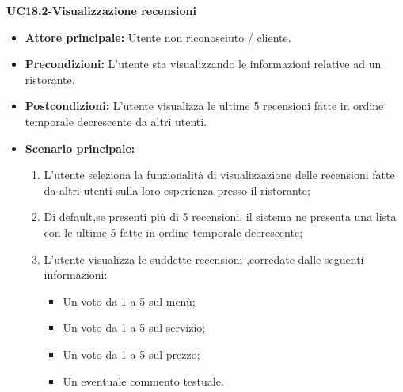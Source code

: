 \textbf{UC18.2-Visualizzazione recensioni}
\begin{itemize}
\item \textbf{Attore principale:} Utente non riconosciuto / cliente.
\item \textbf{Precondizioni:} L'utente sta visualizzando le informazioni relative ad un ristorante.
\item \textbf{Postcondizioni:} L'utente visualizza le ultime 5 recensioni fatte in ordine temporale decrescente da altri utenti.
\item \textbf{Scenario principale:}
\begin{enumerate}
    \item L'utente seleziona la funzionalità di visualizzazione delle recensioni fatte da altri utenti
    sulla loro esperienza presso il ristorante;
    \item Di default,se presenti più di 5 recensioni, il sistema ne presenta una lista con le ultime 5 fatte in ordine temporale decrescente;
    \item L'utente visualizza le suddette recensioni ,corredate dalle seguenti informazioni:
    \begin{itemize}
        \item Un voto da 1 a 5 sul menù;
        \item Un voto da 1 a 5 sul servizio;
        \item Un voto da 1 a 5 sul prezzo;
        \item Un eventuale commento testuale.
    \end{itemize}
\end{enumerate}
\end{itemize}

